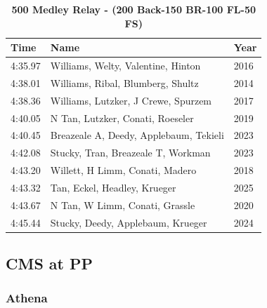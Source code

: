 \begin{table}[H]
\centering
\caption*{\textbf{\textcolor{teamprimary}{500 Medley Relay - (200 Back-150 BR-100 FL-50 FS)}}}
\renewcommand{\arraystretch}{2}
\begin{tabular}{@{}p{}p{}p{}@{}}
\toprule
\rowcolor{teamprimary!25}
\textbf{Time} & \textbf{Name} & \textbf{Year} \\
\midrule
    4:35.97 & Williams, Welty, Valentine, Hinton & 2016 \\
    4:38.01 & Williams, Ribal, Blumberg, Shultz & 2014 \\
    4:38.36 & Williams, Lutzker, J Crewe, Spurzem & 2017 \\
    4:40.05 & N Tan, Lutzker, Conati, Roeseler & 2019 \\
    4:40.45 & Breazeale A, Deedy, Applebaum, Tekieli & 2023 \\
    4:42.08 & Stucky, Tran, Breazeale T, Workman & 2023 \\
    4:43.20 & Willett, H Limm, Conati, Madero & 2018 \\
    4:43.32 & Tan, Eckel, Headley, Krueger & 2025 \\
    4:43.67 & N Tan, W Limm, Conati, Grassle & 2020 \\
    4:45.44 & Stucky, Deedy, Applebaum, Krueger & 2024 \\
\bottomrule
\end{tabular}

\end{table}

\clearpage
\subsection{CMS at PP}

\subsubsection{Athena}

